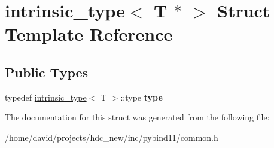 \hypertarget{structintrinsic__type_3_01_t_01_5_01_4}{}\section{intrinsic\+\_\+type$<$ T $\ast$ $>$ Struct Template Reference}
\label{structintrinsic__type_3_01_t_01_5_01_4}
\subsection*{Public Types}
\begin{DoxyCompactItemize}
\item 
typedef \hyperlink{structintrinsic__type}{intrinsic\+\_\+type}$<$ T $>$\+::type {\bfseries type}\hypertarget{structintrinsic__type_3_01_t_01_5_01_4_acbb73521557b43fd38e099972cf37a7e}{}\label{structintrinsic__type_3_01_t_01_5_01_4_acbb73521557b43fd38e099972cf37a7e}

\end{DoxyCompactItemize}


The documentation for this struct was generated from the following file\+:\begin{DoxyCompactItemize}
\item 
/home/david/projects/hdc\+\_\+new/inc/pybind11/common.\+h\end{DoxyCompactItemize}
